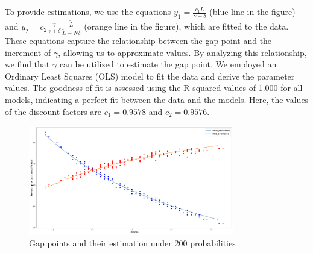 To provide estimations, we use the equations $y_1 = \frac{c_1 \tilde{L}}{\gamma + \delta}$ (blue line in the figure) and $y_2 = c_2 \frac{\gamma}{\gamma + \delta} \frac{\tilde{L}}{\tilde{L}-N \delta}$ (orange line in the figure), which are fitted to the data. These equations capture the relationship between the gap point and the increment of $\gamma$, allowing us to approximate values. By analyzing this relationship, we find that $\gamma$ can be utilized to estimate the gap point. We employed an Ordinary Least Squares (OLS) model to fit the data and derive the parameter values. The goodness of fit is assessed using the R-squared values of 1.000 for all models, indicating a perfect fit between the data and the models. Here, the values of the discount factors are $c_1 = 0.9578$ and $c_2 = 0.9576$.

\begin{figure}[ht]
  \centering
    \includegraphics[width=0.8\textwidth]{./Figures/gamma_estimation.pdf}
  \caption{Gap points and their estimation under 200 probabilities}
\end{figure}






